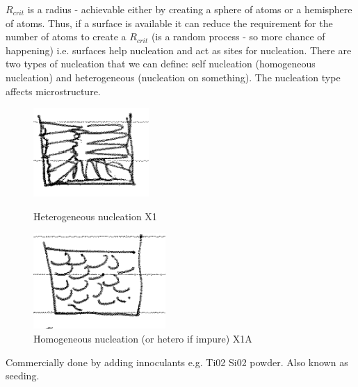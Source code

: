 \documentclass[class=report, crop=false, 12pt,a4paper]{standalone}
\begin{document}
$R_{crit}$ is a radius - achievable either by creating a sphere of atoms or a hemisphere of atoms. Thus, if a surface is available it can reduce the requirement for the number of atoms to create a $R_{crit}$ (is a random process - so more chance of happening) i.e. surfaces help nucleation and act as sites for nucleation. There are two types of nucleation that we can define: self nucleation (homogeneous nucleation) and heterogeneous (nucleation on something). The nucleation type affects microstructure. 
\begin{figure}[h!]
  \begin{minipage}[b]{0.45\textwidth}
    \includegraphics[width = \linewidth]{../img/heteronucleation}
    \caption{Heterogeneous nucleation X1}
  \end{minipage}
  \hfill
  \begin{minipage}[b]{0.45\textwidth}
    \includegraphics[width = \linewidth]{../img/homonucleation}
    \caption{Homogeneous nucleation (or hetero if impure) X1A}
  \end{minipage} 
\end{figure}
Commercially done by adding innoculants e.g. Ti02 Si02 powder. Also known as seeding. 
\end{document}
